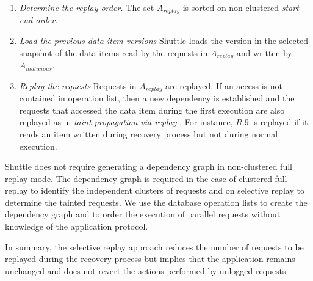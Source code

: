 \begin{enumerate}
\item \textit{Determine the replay order.} 
The set $A_{replay}$ is sorted on non-clustered \emph{start-end order}.

\item \textit{Load the previous data item versions}
Shuttle loads the version in the selected snapshot of the data items read by the requests in $A_{replay}$ and written by $A_{malicious}$.

\item \textit{Replay the requests}
Requests in $A_{replay}$ are replayed. If an access is not contained in operation list, then a new dependency is established and the requests that accessed the data item during the first execution are also replayed as in \emph{taint propagation via replay} \cite{retro}. For instance, $R.9$ is replayed if it reads an item written during recovery process but not during normal execution. 
\end{enumerate}





 Shuttle does not require generating a dependency graph in non-clustered full replay mode. The dependency graph is required in the case of clustered full replay to identify the independent clusters of requests and on selective replay to determine the tainted requests. We use the database operation lists to create the dependency graph and to order the execution of parallel requests without knowledge of the application protocol. 
 
 In summary, the selective replay approach reduces the number of requests to be replayed during the recovery process but implies that the application remains unchanged and does not revert the actions performed by unlogged requests. 


